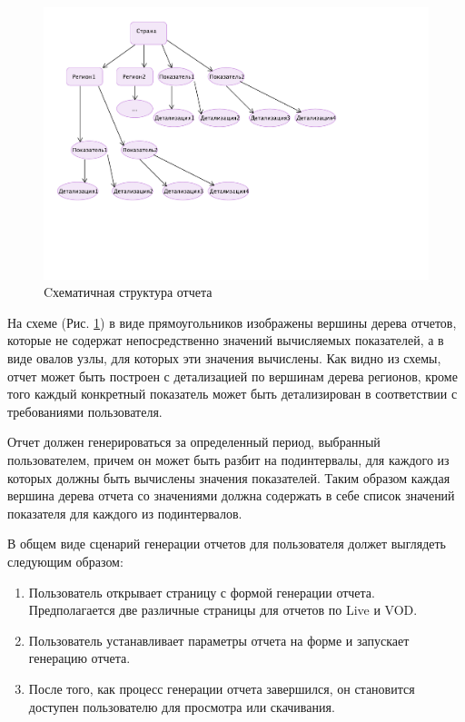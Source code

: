 \begin{figure}[!ht]
\begin{center}
\hspace*{-1cm} \includegraphics[scale=0.6, trim=0mm 50mm 70mm 0mm, clip]{../resources/uml/ReportScheme.pdf}
\caption{Cхематичная структура отчета}
\label{gr:report:scheme}
\end{center}
\end{figure} 

На схеме (Рис. \ref{gr:report:scheme}) в виде прямоугольников изображены вершины дерева отчетов,
которые не содержат непосредственно значений вычисляемых показателей, а в виде овалов узлы,
для которых эти значения вычислены. Как видно из схемы, отчет может быть построен с детализацией 
по вершинам дерева регионов, кроме того каждый конкретный показатель может быть детализирован
в соответствии с требованиями пользователя.

Отчет должен генерироваться за определенный период, выбранный пользователем, причем он может быть 
разбит на подинтервалы, для каждого из которых должны быть вычислены значения показателей.
Таким образом каждая вершина дерева отчета со значениями должна содержать в себе список 
значений показателя для каждого из подинтервалов.

В общем виде сценарий генерации отчетов для пользователя должет выглядеть следующим образом:
\begin{enumerate}
\item{
  Пользователь открывает страницу с формой генерации отчета. Предполагается две различные страницы
  для отчетов по Live и VOD.
}
\item{
  Пользователь устанавливает параметры отчета на форме и запускает генерацию отчета.
}
\item{
  После того, как процесс генерации отчета завершился, он становится доступен пользователю для просмотра
  или скачивания.
}
\end{enumerate} 

